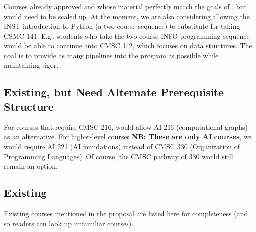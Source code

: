 \documentclass[
10pt, %
a4paper, %
oneside, %
headinclude,footinclude, %
BCOR5mm, %
]{scrartcl}
\begin{document}
    Courses already approved and whose material perfectly match the goals of \short{}, but would need to be scaled up.  At the moment, we are also considering allowing the INST introduction to Python (a two course sequence) to substitute for taking CSMC 141.  E.g., students who take the two course INFO programming sequence would be able to continue onto CMSC 142, which focuses on data structures.  The goal is to provide as many pipelines into the program as possible while maintaining rigor.
    
  


    \subsection{Existing, but Need Alternate Prerequisite Structure}

    For courses that require CMSC 216, would allow AI 216 (computational graphs) as an alternative.  For higher-level courses \textbf{NB: These are only AI courses}, we would require AI 221 (AI foundations) instead of CMSC 330 (Organization of Programming Languages).  Of course, the CMSC pathway of 330 would still remain an option.

    

  \subsection{Existing}

    Existing courses mentioned in the proposal are listed here for completeness (and so readers can look up unfamiliar courses).  

  
  
  



%


\end{document}
